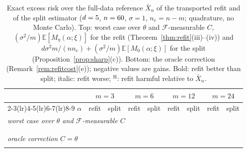 \documentclass[10pt,a4paper]{article}
\theoremstyle{plain}
\theoremstyle{definition}
\theoremstyle{remark}
\newcommand{\E}{\mathbb{E}}
\begin{document}
\begin{table}[t]
\centering\footnotesize\setlength{\tabcolsep}{3.5pt}
\begin{tabular}{rcccccccc}
\toprule
& \multicolumn{2}{c}{$m=3$} & \multicolumn{2}{c}{$m=6$} & \multicolumn{2}{c}{$m=12$} & \multicolumn{2}{c}{$m=24$}\\
\cmidrule(lr){2-3}\cmidrule(lr){4-5}\cmidrule(lr){6-7}\cmidrule(lr){8-9}
$\alpha$ & refit & split & refit & split & refit & split & refit & split\\
\midrule
\multicolumn{9}{l}{\emph{worst case over $\theta$ and $\mathcal F$-measurable $C$}}\\
\\
\\
\midrule
\multicolumn{9}{l}{\emph{oracle correction $C=\theta$}}\\
\\
\bottomrule
\end{tabular}
\caption{Exact excess risk over the full-data reference $\bar X_n$ of the transported refit and of the split estimator ($d=5$, $n=60$, $\sigma=1$, $n_e=n-m$; quadrature, no Monte Carlo). Top: worst case over $\theta$ and $\mathcal F$-measurable $C$, $(\sigma^2/m)\E[M_\eta(\alpha;\xi)]$ for the refit (Theorem~\ref{thm:refit}(iii)--(iv)) and $d\sigma^2m/(nn_e)+(\sigma^2/m)\E[M_0(\alpha;\xi)]$ for the split (Proposition~\ref{prop:sharp}(c)). Bottom: the oracle correction (Remark~\ref{rem:refitcost}(e)); negative values are gains. Bold: refit better than split; italic: refit worse; $^{\mathrm H}$: refit harmful relative to $\bar X_n$.}
\label{tab:worstrefit}
\end{table}
\end{document}
